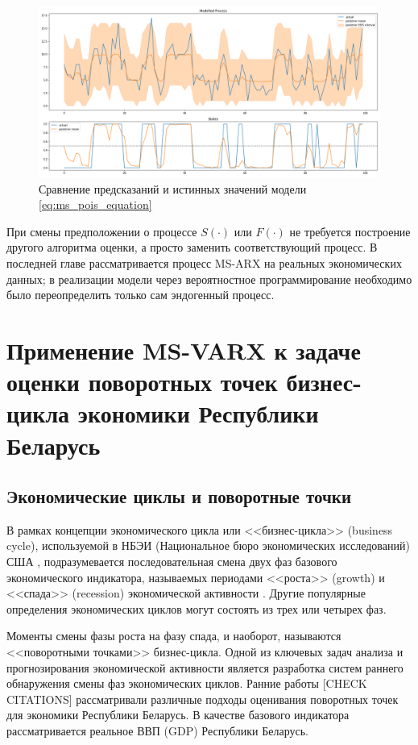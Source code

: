 \documentclass[a4paper,14pt]{extreport}
\begin{document}
\begin{figure}[H]
	\includegraphics[width=\linewidth]{img/gen/pp_ms_pois_fit.png}
	\caption{Сравнение предсказаний и истинных значений модели \ref{eq:ms_pois_equation}}
	\label{fig:pp_ms_pois_fit}
\end{figure}

При смены предположении о процессе $S(\cdot)$ или $F(\cdot)$ не требуется построение другого алгоритма оценки, а просто заменить соответствующий процесс. В последней главе рассматривается процесс MS-ARX на реальных экономических данных; в реализации модели через вероятностное программирование необходимо было переопределить только сам эндогенный процесс.


\chapter{Применение MS-VARX к задаче оценки поворотных точек бизнес-цикла экономики Республики Беларусь}
\section{Экономические циклы и поворотные точки}

В рамках концепции экономического цикла или <<бизнес-цикла>> (business cycle), используемой в НБЭИ (Национальное бюро экономических исследований) США \cite{nberDevelopment}, подразумевается последовательная смена двух фаз базового экономического индикатора, называемых периодами <<роста>> (growth) и <<спада>> (recession) экономической активности \cite{oecdCycleExtraction}. Другие популярные определения экономических циклов могут состоять из трех или четырех фаз.

Моменты смены фазы роста на фазу спада, и наоборот, называются <<поворотными точками>> бизнес-цикла. Одной из ключевых задач анализа и прогнозирования экономической активности является разработка систем раннего обнаружения смены фаз экономических циклов.  Ранние работы \cite{esiMaking,esiExtra,mak_mal_bv_2018} [CHECK CITATIONS] рассматривали различные подходы оценивания поворотных точек для экономики Республики Беларусь. В качестве базового индикатора рассматривается реальное ВВП (GDP) Республики Беларусь.
\end{document}
